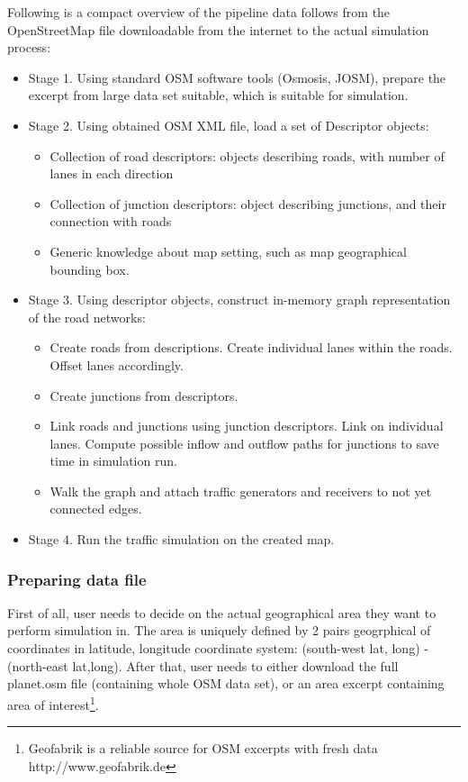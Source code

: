 Following is a compact overview of the pipeline data follows from the OpenStreetMap file downloadable from the internet to the actual simulation process:
\begin{itemize}
    \item Stage 1. Using standard OSM software tools (Osmosis, JOSM), prepare the excerpt from large data set suitable, which is suitable for simulation.

    \item Stage 2. Using obtained OSM XML file, load a set of Descriptor objects:
    \begin{itemize}
        \item Collection of road descriptors: objects describing roads, with number of lanes in each direction
        \item Collection of junction descriptors: object describing junctions, and their connection with roads
        \item Generic knowledge about map setting, such as map geographical bounding box.
    \end{itemize}

    \item Stage 3. Using descriptor objects, construct in-memory graph representation of the road networks:
    \begin{itemize}
        \item Create roads from descriptions. Create individual lanes within the roads. Offset lanes accordingly.
        \item Create junctions from descriptors.
        \item Link roads and junctions using junction descriptors. Link on individual lanes. Compute possible inflow and outflow paths for junctions to save time in simulation run.
        \item Walk the graph and attach traffic generators and receivers to not yet connected edges.
    \end{itemize}

    \item Stage 4. Run the traffic simulation on the created map.
\end{itemize}

\subsubsection{Preparing data file}
First of all, user needs to decide on the actual geographical area they want to perform simulation in. The area is uniquely defined by 2 pairs geogrphical of coordinates in latitude, longitude coordinate system: (south-west lat, long) - (north-east lat,long). After that, user needs to either download the full planet.osm file (containing whole OSM data set), or an area excerpt containing area of interest\footnote{Geofabrik is a reliable source for OSM excerpts with fresh data http://www.geofabrik.de}.

